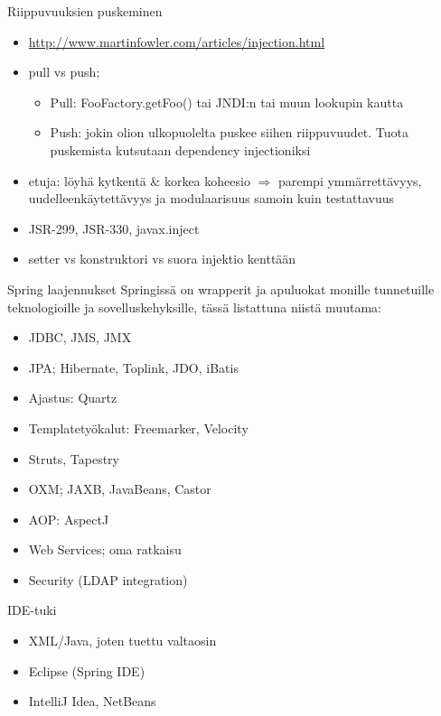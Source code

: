 \documentclass[hyperref={pdfauthor=\AUTHOR},14pt]{beamer}
\begin{document}
\begin{frame}{Riippuvuuksien puskeminen}
\begin{itemize}
\item \url{http://www.martinfowler.com/articles/injection.html}
\item pull vs push;
\begin{itemize}
\item Pull: FooFactory.getFoo() tai JNDI:n   tai muun lookupin kautta
\item Push: jokin olion ulkopuolelta puskee siihen
 riippuvuudet. Tuota puskemista kutsutaan dependency injectioniksi
\end{itemize}
\item etuja: löyhä kytkentä \& korkea koheesio $ \Rightarrow $ parempi
  ymmärrettävyys, uudelleenkäytettävyys ja modulaarisuus samoin kuin testattavuus
\item JSR-299, JSR-330, javax.inject
\item setter vs konstruktori vs suora injektio kenttään
\end{itemize}
\end{frame}

\begin{frame}{Spring laajennukset}
Springissä on wrapperit ja apuluokat monille tunnetuille
teknologioille ja sovelluskehyksille, tässä listattuna niistä muutama:
\begin{itemize}
\item JDBC, JMS, JMX
\item JPA; Hibernate, Toplink, JDO, iBatis
\item Ajastus: Quartz
\item Templatetyökalut: Freemarker, Velocity
\item Struts, Tapestry
\item OXM; JAXB, JavaBeans, Castor 
\item AOP: AspectJ
\item Web Services; oma ratkaisu
\item Security (LDAP integration)
\end{itemize}
\end{frame}

\begin{frame}{IDE-tuki}
\begin{itemize}
\item XML/Java, joten tuettu valtaosin
\item Eclipse (Spring IDE)
\item IntelliJ Idea, NetBeans
\end{itemize}
\end{frame}
\end{document}
